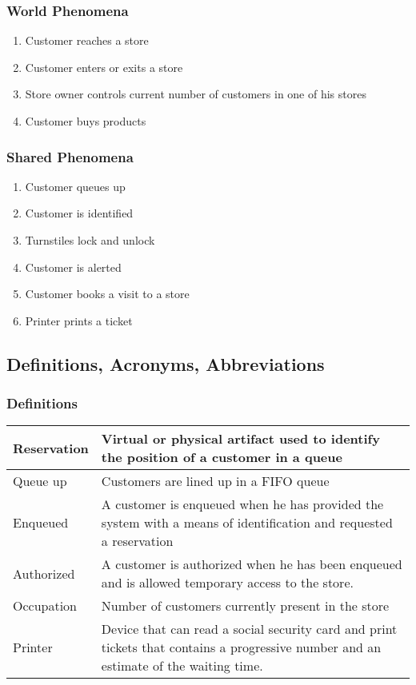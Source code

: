 \subsubsection{World Phenomena}
\begin{enumerate}[label=WP\arabic*]
	\item Customer reaches a store
	\item Customer enters or exits a store
	\item Store owner controls current number of customers in one of his stores
	\item Customer buys products
\end{enumerate}
\subsubsection{Shared Phenomena}
\begin{enumerate}[label=SP\arabic*]
	\item Customer queues up
	\item Customer is identified %
	\item Turnstiles lock and unlock
	\item Customer is alerted%
	\item Customer books a visit to a store
	\item Printer prints a ticket
\end{enumerate}
\subsection{Definitions, Acronyms, Abbreviations}
\subsubsection{Definitions}
\begin{tabular}{ | m{5cm} | m{10cm} | }
	\hline
	Reservation & Virtual or physical artifact used to identify the position of a customer in a queue \\
	\hline
	Queue up & Customers are lined up in a FIFO queue\\
	\hline
	Enqueued & A customer is enqueued when he has provided the system with a means of identification and requested a reservation\\
	\hline
	Authorized & A customer is authorized when he has been enqueued and is allowed temporary access to the store.\\
	\hline
	Occupation & Number of customers currently present in the store\\
	\hline
	Printer & Device that can read a social security card and print tickets that contains a progressive number and an estimate of the waiting time.\\
	\hline
\end{tabular}

